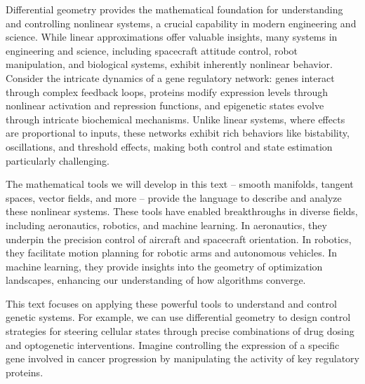 

Differential geometry provides the mathematical foundation for understanding and controlling nonlinear systems, a crucial capability in modern engineering and science. While linear approximations offer valuable insights, many systems in engineering and science, including spacecraft attitude control, robot manipulation, and biological systems, exhibit inherently nonlinear behavior. Consider the intricate dynamics of a gene regulatory network: genes interact through complex feedback loops, proteins modify expression levels through nonlinear activation and repression functions, and epigenetic states evolve through intricate biochemical mechanisms. Unlike linear systems, where effects are proportional to inputs, these networks exhibit rich behaviors like bistability, oscillations, and threshold effects, making both control and state estimation particularly challenging.

The mathematical tools we will develop in this text – smooth manifolds, tangent spaces, vector fields, and more – provide the language to describe and analyze these nonlinear systems. These tools have enabled breakthroughs in diverse fields, including aeronautics, robotics, and machine learning. In aeronautics, they underpin the precision control of aircraft and spacecraft orientation. In robotics, they facilitate motion planning for robotic arms and autonomous vehicles. In machine learning, they provide insights into the geometry of optimization landscapes, enhancing our understanding of how algorithms converge.

This text focuses on applying these powerful tools to understand and control genetic systems. For example, we can use differential geometry to design control strategies for steering cellular states through precise combinations of drug dosing and optogenetic interventions. Imagine controlling the expression of a specific gene involved in cancer progression by manipulating the activity of key regulatory proteins.

